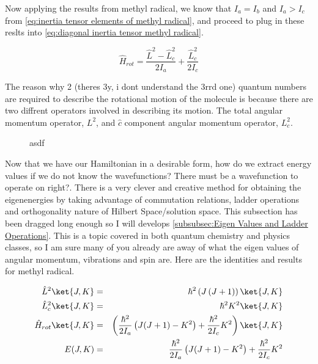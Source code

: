 \documentclass[11pt,a4paper]{book}
\newcommand{\imginput}[1]{} %
\begin{document}
			Now applying the results from methyl radical, we know that $I_a = I_b$ and $I_a > I_c$ from \autoref{eq:inertia tensor elements of methyl radical}, and proceed to plug in these reslts into \autoref{eq:diagonal inertia tensor methyl radical}.
			
			\begin{equation}
				\label{eq:rotational Hamiltonian for methyl radical}
				\hat{H}_{rot}  =  \dfrac{\hat{L}^2 - \hat{L}^2_c}{2I_a} + \dfrac{\hat{L}_c^2}{2I_c}
			\end{equation}				
			
			The reason why 2 (theres 3y, i dont understand the 3rrd one) quantum numbers are required to describe the rotational motion of the molecule is because there are two diffrent operators involved in describing its motion. The total angular momentum operator, $L^2$, and $\hat{c}$ component angular momentum operator, $L^2_c$.
			
			\begin{figure} [!ht]
				\centering
				\large
				\def\svgwidth{\columnwidth}
				\resizebox{12cm}{!}{\imginput{images/Methyl-Radical-Energy-Level-Distribution.pdf_tex}}
				\caption{asdf}
				\label{fig:Methyl-Radical-Energy-Level-Distribution}
			\end{figure}
			
			Now that we have our Hamiltonian in a desirable form, how do we extract energy values if we do not know the wavefunctions? There must be a wavefunction to operate on right?. There is a very clever and creative method for obtaining the eigenenergies by taking advantage of commutation relations, ladder operations and orthogonality nature of Hilbert Space/solution space. This subsection has been dragged long enough so I will develops \autoref{subsubsec:Eigen Values and Ladder Operations}. This is a topic covered in both quantum chemistry and physics classes, so I am sure many of you already are away of what the eigen values of angular momentum, vibrations and spin are. Here are the identities and results for methyl radical.
			
			\begin{eqnarray}
				\label{eq:total angular momentum eigen value}
				\hat{L}^2\ket{J,K}&=& \hbar^2\left(J\left(J+1\right)\right)\ket{J,K}\\
				\label{eq:component angular momentum eigen value}
				\hat{L}^2_c\ket{J,K} &=&\hbar^2K^2\ket{J,K} \\
				\label{eq:rotational eigen energy level of methyl radical}
				\hat{H}_{rot}\ket{J,K}  &=&\left( \dfrac{\hbar^2}{2I_a} \left( J(J+1) - K^2\right)  + \dfrac{\hbar^2}{2I_c} K^2\right)\ket{J,K} \\
				\label{eq:eigen energy level of methyl radical}
				E(J,K) &=& \dfrac{\hbar^2}{2I_a} \left( J(J+1) - K^2\right)  + \dfrac{\hbar^2}{2I_c} K^2
			\end{eqnarray}
	
\end{document}
